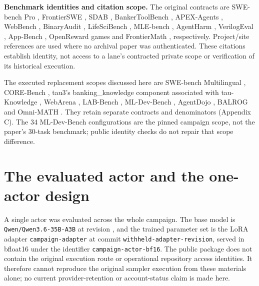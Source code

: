 \documentclass[12pt,a4paper]{report}
\DeclareRobustCommand{\longtok}[1]{\texttt{\seqsplit{#1}}}
\begin{document}
\textbf{Benchmark identities and citation scope.} The original contracts
are SWE-bench Pro \citep{deng2025swebenchpro}, FrontierSWE
\citep{proximal2026frontierswe}, SDAB \citep{emulated2026sdab},
BankerToolBench \citep{lau2026bankertoolbench}, APEX-Agents
\citep{vidgen2026apexagents}, WebBench \citep{halluminatewebbench},
BinaryAudit \citep{quesma2026binaryaudit}, LifeSciBench
\citep{liu2026lifescibench}, MLE-bench \citep{chan2025mlebench},
AgentHarm \citep{andriushchenko2025agentharm}, VerilogEval
\citep{liu2023verilogeval}, App-Bench \citep{afterquery2025appbench},
OpenReward games \citep{openrewardplatform} and FrontierMath
\citep{glazer2024frontiermath}, respectively. Project/site references
are used where no archival paper was authenticated. These citations
establish identity, not access to a lane's contracted private scope or
verification of its historical execution.

The executed replacement scopes discussed here are SWE-bench
Multilingual \citep{khandpurswemultilingual}, CORE-Bench
\citep{siegel2024corebench}, tau3's banking\_knowledge component
associated with tau-Knowledge \citep{shi2026tauknowledge}, WebArena
\citep{zhou2024webarena}, LAB-Bench \citep{laurent2024labbench},
ML-Dev-Bench \citep{padigela2025mldevbench}, AgentDojo
\citep{debenedetti2024agentdojo}, BALROG \citep{paglieri2025balrog} and
Omni-MATH \citep{gao2024omnimath}. They retain separate contracts and
denominators (Appendix C). The 34 ML-Dev-Bench configurations are the
pinned campaign scope, not the paper's 30-task benchmark; public
identity checks do not repair that scope difference.

\section{The evaluated actor and the one-actor
design}\label{the-evaluated-actor-and-the-one-actor-design}

A single actor was evaluated across the whole campaign. The base model
is \texttt{Qwen/Qwen3.6-35B-A3B} at revision
\longtok{995ad96eacd98c81ed38be0c5b274b04031597b0}, and the trained
parameter set is the LoRA adapter \texttt{campaign-adapter} at commit
\texttt{withheld-adapter-revision}, served in bfloat16 under the
identifier \texttt{campaign-actor-bf16}. The public package does not
contain the original execution route or operational repository access
identities. It therefore cannot reproduce the original sampler execution
from these materials alone; no current provider-retention or
account-status claim is made here.
\end{document}
